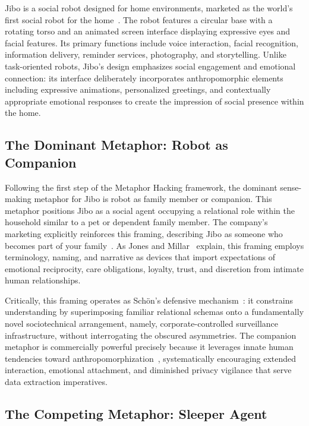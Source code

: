 \documentclass{ieee-portfolio}
\begin{document}
Jibo is a social robot designed for home environments, marketed as the world's first social robot for the home~\cite{breazeal_jibo_2014}. The robot features a circular base with a rotating torso and an animated screen interface displaying expressive eyes and facial features. Its primary functions include voice interaction, facial recognition, information delivery, reminder services, photography, and storytelling. Unlike task-oriented robots, Jibo's design emphasizes social engagement and emotional connection: its interface deliberately incorporates anthropomorphic elements including expressive animations, personalized greetings, and contextually appropriate emotional responses to create the impression of social presence within the home.

\subsection{The Dominant Metaphor: Robot as Companion}

Following the first step of the Metaphor Hacking framework, the dominant sense-making metaphor for Jibo is robot as family member or companion. This metaphor positions Jibo as a social agent occupying a relational role within the household similar to a pet or dependent family member. The company's marketing explicitly reinforces this framing, describing Jibo as someone who becomes part of your family~\cite{guizzo_jibo_good_2015}. As Jones and Millar~\cite{jones_hacking_2017} explain, this framing employs terminology, naming, and narrative as devices that import expectations of emotional reciprocity, care obligations, loyalty, trust, and discretion from intimate human relationships.

Critically, this framing operates as Sch\"{o}n's defensive mechanism~\cite{schon_generative_1993}: it constrains understanding by superimposing familiar relational schemas onto a fundamentally novel sociotechnical arrangement, namely, corporate-controlled surveillance infrastructure, without interrogating the obscured asymmetries. The companion metaphor is commercially powerful precisely because it leverages innate human tendencies toward anthropomorphization~\cite{darling_whos_2015}, systematically encouraging extended interaction, emotional attachment, and diminished privacy vigilance that serve data extraction imperatives.

\subsection{The Competing Metaphor: Sleeper Agent}
\end{document}
